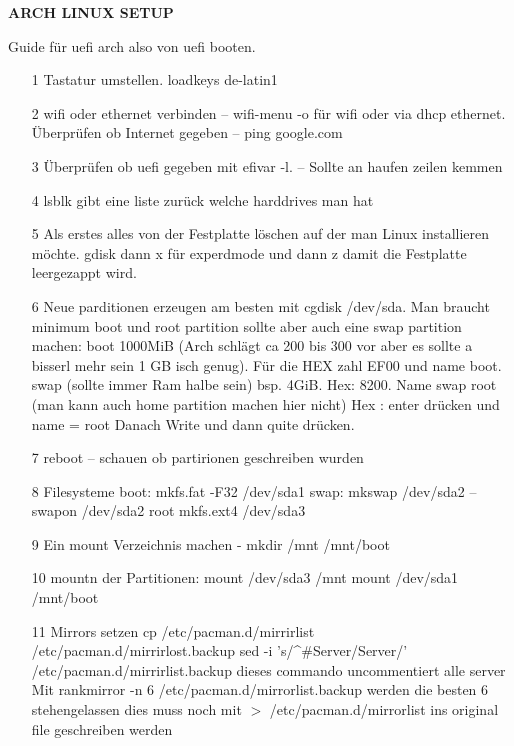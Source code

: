 \documentclass[a4paper,12pt]{article}
\begin{document}
\begin{titlepage}
\begin{LARGE}
	\begin{center}
		\textbf{ARCH LINUX SETUP}
	\end{center}
\end{LARGE}
\end{titlepage}
Guide für uefi arch also von uefi booten. 
\begin{itemize}
	\item[1] Tastatur umstellen. loadkeys de-latin1	
	\item[2] wifi oder ethernet verbinden -- wifi-menu -o für wifi oder via dhcp ethernet. Überprüfen ob Internet gegeben -- ping google.com
	\item[3] Überprüfen ob uefi gegeben mit efivar -l. -- Sollte an haufen zeilen kemmen
	\item[4] lsblk gibt eine liste zurück welche harddrives man hat
	\item[5] Als erstes alles von der Festplatte löschen auf der man Linux installieren möchte. gdisk dann x für experdmode und dann z damit die Festplatte leergezappt wird.
	\item[6] Neue parditionen erzeugen am besten mit cgdisk /dev/sda. Man braucht minimum boot und root partition sollte aber auch eine swap partition machen:
	\subitem boot 1000MiB (Arch schlägt ca 200 bis 300 vor aber es sollte a bisserl mehr sein 1 GB isch genug). Für die HEX zahl EF00 und name boot. 
	\subitem swap (sollte immer Ram halbe sein) bsp. 4GiB. Hex: 8200. Name swap
	\subitem root (man kann auch home partition machen hier nicht) Hex : enter drücken und name = root
	Danach Write und dann quite drücken.
	\item[7] reboot -- schauen ob partirionen geschreiben wurden
	\item[8] Filesysteme
	\subitem boot: mkfs.fat -F32 /dev/sda1
	\subitem swap: mkswap /dev/sda2 -- swapon /dev/sda2
	\subitem root mkfs.ext4 /dev/sda3
	\item[9] Ein mount Verzeichnis machen - mkdir /mnt /mnt/boot 
	\item[10] mountn der Partitionen:
	\subitem mount /dev/sda3 /mnt
	\subitem mount /dev/sda1 /mnt/boot
	\item[11] Mirrors setzen 
	\subitem cp /etc/pacman.d/mirrirlist /etc/pacman.d/mirrirlost.backup 
	\subitem sed -i 's/\^{}\#Server/Server/' /etc/pacman.d/mirrirlist.backup dieses commando uncommentiert alle server
	\subitem Mit rankmirror -n 6 /etc/pacman.d/mirrorlist.backup werden die besten 6 stehengelassen dies muss noch mit $>$ /etc/pacman.d/mirrorlist ins original file geschreiben werden

\end{itemize}
\end{document}
